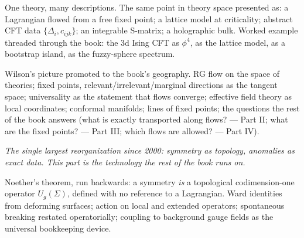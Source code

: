 One theory, many descriptions. The same point in theory space presented as: a Lagrangian flowed from a free fixed point; a lattice model at criticality; abstract CFT data $\{\Delta_i, c_{ijk}\}$; an integrable S-matrix; a holographic bulk. Worked example threaded through the book: the 3d Ising CFT as $\phi^4$, as the lattice model, as a bootstrap island, as the fuzzy-sphere spectrum.

Wilson's picture promoted to the book's geography. RG flow on the space of theories; fixed points, relevant/irrelevant/marginal directions as the tangent space; universality as the statement that flows converge; effective field theory as local coordinates; conformal manifolds; lines of fixed points; the questions the rest of the book answers (what is exactly transported along flows? --- Part II; what are the fixed points? --- Part III; which flows are allowed? --- Part IV).


\noin \emph{The single largest reorganization since 2000: symmetry as topology, anomalies as exact data. This part is the technology the rest of the book runs on.}

Noether's theorem, run backwards: a symmetry \emph{is} a topological codimension-one operator $U_g(\Sigma)$, defined with no reference to a Lagrangian. Ward identities from deforming surfaces; action on local and extended operators; spontaneous breaking restated operatorially; coupling to background gauge fields as the universal bookkeeping device.

